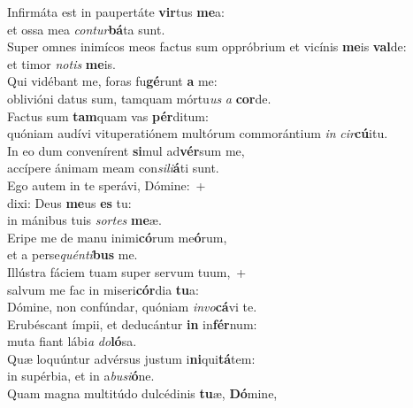 \oddverse Infirmáta est in paupertáte \textbf{vir}tus \textbf{me}a:~\*\\
\oddverse et ossa mea \textit{con}\textit{tur}\textbf{bá}ta sunt.\\
\evenverse Super omnes inimícos meos factus sum oppróbrium et vicínis \textbf{me}is \textbf{val}de:~\*\\
\evenverse et timor \textit{no}\textit{tis} \textbf{me}is.\\
\oddverse Qui vidébant me, foras fu\textbf{gé}runt \textbf{a} me:~\*\\
\oddverse oblivióni datus sum, tamquam mórtu\textit{us} \textit{a} \textbf{cor}de.\\
\evenverse Factus sum \textbf{tam}quam vas \textbf{pér}ditum:~\*\\
\evenverse quóniam audívi vituperatiónem multórum commorántium \textit{in} \textit{cir}\textbf{cú}itu.\\
\oddverse In eo dum convenírent \textbf{si}mul ad\textbf{vér}sum me,~\*\\
\oddverse accípere ánimam meam con\textit{si}\textit{li}\textbf{á}ti sunt.\\
\evenverse Ego autem in te sperávi, Dómine:~+\\
\evenverse  dixi: Deus \textbf{me}us \textbf{es} tu:~\*\\
\evenverse in mánibus tuis \textit{sor}\textit{tes} \textbf{me}æ.\\
\oddverse Eripe me de manu inimi\textbf{có}rum me\textbf{ó}rum,~\*\\
\oddverse et a perse\textit{quén}\textit{ti}\textbf{bus} me.\\
\evenverse Illústra fáciem tuam super servum tuum,~+\\
\evenverse  salvum me fac in miseri\textbf{cór}dia \textbf{tu}a:~\*\\
\evenverse Dómine, non confúndar, quóniam \textit{in}\textit{vo}\textbf{cá}vi te.\\
\oddverse Erubéscant ímpii, et deducántur \textbf{in} in\textbf{fér}num:~\*\\
\oddverse muta fiant lábi\textit{a} \textit{do}\textbf{ló}sa.\\
\evenverse Quæ loquúntur advérsus justum i\textbf{ni}qui\textbf{tá}tem:~\*\\
\evenverse in supérbia, et in a\textit{bu}\textit{si}\textbf{ó}ne.\\
\oddverse Quam magna multitúdo dulcédinis \textbf{tu}æ, \textbf{Dó}mine,~\*\\
